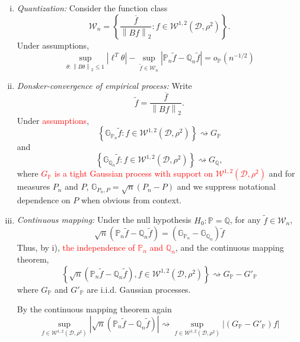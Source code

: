 \documentclass{article}
\newcommand{\norm}[1]{\left\lVert#1\right\rVert}
\newcommand{\abs}[1]{\left \lvert #1 \right \rvert}
\newcommand{\set}[1]{\left\{#1\right\}}
\newcommand{\lbf}{\bm{\ell}}
\newcommand{\Dset}{\mathcal{D}}
\newcommand{\Wset}{\mathcal{W}}
\newcommand{\Pbb}{\mathbb{P}}
\newcommand{\Qbb}{\mathbb{Q}}
\newcommand{\Gbb}{\mathbb{G}}
\newcommand{\1}{\mathbf{1}}
\theoremstyle{alden}
\theoremstyle{aldenthm}
\theoremstyle{remark}
\begin{document}
\begin{enumerate}[(i)]
	\item \emph{Quantization:} Consider the function class
	\begin{equation*}
	\Wset_n = \set{\frac{\overline{f}}{\norm{Bf}_2}: f \in \Wset^{1,2}(\Dset,\rho^2)}.
	\end{equation*}
	Under assumptions,
	\begin{equation*}
	\sup_{\theta: \norm{B\theta}_2 \leq 1} \abs{\lbf^T \theta} - \sup_{\widetilde{f} \in \Wset_n} \abs{\Pbb_n \widetilde{f} - \Qbb_n \widetilde{f}} = o_{\Pbb}(n^{-1/2})
	\end{equation*}
	\item \emph{Donsker-convergence of empirical process:} Write 
	\begin{equation*}
	\widetilde{f} = \frac{\overline{f}}{\norm{Bf}_2}.
	\end{equation*}
	Under \textcolor{red}{assumptions},
	\begin{equation*}
	\set{\Gbb_{\Pbb_n}\widetilde{f}: f \in \Wset^{1,2}(\Dset,\rho^2)} \rightsquigarrow G_{\Pbb}
	\end{equation*}
	and 
	\begin{equation*}
	\set{\Gbb_{\Qbb_n}\widetilde{f}: f \in \Wset^{1,2}(\Dset,\rho^2)} \rightsquigarrow G_{\Qbb},
	\end{equation*}
	where \textcolor{red}{$G_{\Pbb}$ is a tight Gaussian process with support on $\Wset^{1,2}(\Dset,\rho^2)$} and for measures $P_n$ and $P$, $\Gbb_{P_n,P} = \sqrt{n}(P_n - P)$ and we suppress notational dependence on $P$ when obvious from context.
	\item \emph{Continuous mapping:}
	Under the null hypothesis $H_0: \Pbb = \Qbb$, for any $\widetilde{f} \in \Wset_n$, 
	\begin{equation*}
	\sqrt{n}(\Pbb_n \widetilde{f} - \Qbb_n \widetilde{f}) = (\Gbb_{\Pbb_n} - \Gbb_{\Qbb_n})\widetilde{f}
	\end{equation*}
	Thus, by i), \textcolor{red}{the independence of $\Pbb_n$ and $\Qbb_n$}, and the continuous mapping theorem,
	\begin{equation*}
	\set{\sqrt{n}(\Pbb_n \widetilde{f} - \Qbb_n \widetilde{f}), f \in \Wset^{1,2}(\Dset,\rho^2)} \rightsquigarrow G_{\Pbb} - G'_{\Pbb}
	\end{equation*}
	where $G_{\Pbb}$ and $G'_{\Pbb}$ are i.i.d. Gaussian processes.
	
	By the continuous mapping theorem again
	\begin{equation*}
	\sup_{f \in \Wset^{1,2}(\Dset,\rho^2)} \abs{\sqrt{n}(\Pbb_n \widetilde{f} - \Qbb_n \widetilde{f}) } \rightsquigarrow \sup_{f \in \Wset^{1,2}(\Dset,\rho^2)} \abs{(G_{\Pbb} - G'_{\Pbb})f}
	\end{equation*}
\end{enumerate}
\end{document}
